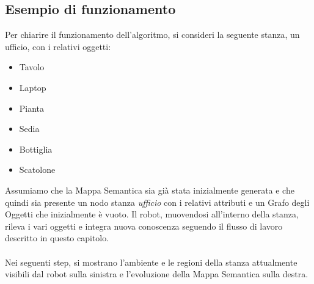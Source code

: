 \subsection{Esempio di funzionamento}
Per chiarire il funzionamento dell'algoritmo, si consideri la seguente stanza, un ufficio, con i relativi oggetti:
\begin{itemize}
  \item Tavolo
  \item Laptop
  \item Pianta
  \item Sedia
  \item Bottiglia
  \item Scatolone
\end{itemize}
Assumiamo che la Mappa Semantica sia già stata inizialmente generata e che quindi sia presente un nodo stanza \textit{ufficio} con i relativi attributi e un Grafo degli Oggetti che inizialmente è vuoto. Il robot, muovendosi all'interno della stanza, rileva i vari oggetti e integra nuova conoscenza seguendo il flusso di lavoro descritto in questo capitolo.\\\\
Nei seguenti step, si mostrano l'ambiente e le regioni della stanza attualmente visibili dal robot sulla sinistra e l'evoluzione della Mappa Semantica sulla destra.~
